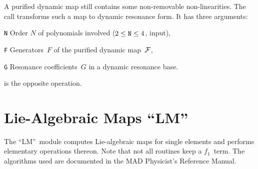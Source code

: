 A purified dynamic map still contains some non-removable
non-linearities. 
The call
transforms such a map to dynamic resonance form.
It has three arguments:
\begin{mylist}
\item[\tt N]
Order $N$ of polynomials involved ($2 \le \hbox{\tt N} \le 4$, input),
\item[\tt F]
Generators~$F$ of the purified dynamic map~$\cal F$,
\item[\tt G]
Resonance coefficients~$G$ in a dynamic resonance base.
\end{mylist}
is the opposite operation.


\chapter{Lie-Algebraic Maps ``LM''}
\label{LM}
The ``LM''~module computes Lie-algebraic maps
for single elements and performs elementary operations thereon.
Note that not all routines keep a $f_1$~term.
The algorithms used are documented in the MAD Physicist's Reference
Manual. 

